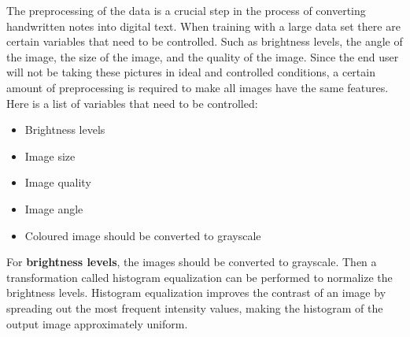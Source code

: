 \documentclass[twoside,a4paper]{article}
\begin{document}
The preprocessing of the data is a crucial step in the process of converting handwritten notes into digital text. When training with a large data set there are certain variables that need to be controlled.
Such as brightness levels, the angle of the image, the size of the image, and the quality of the image. Since the end user will not be taking these pictures in ideal and controlled conditions,
a certain amount of preprocessing is required to make all images have the same features. 
Here is a list of variables that need to be controlled:
\begin{itemize}
    \item Brightness levels
    \item Image size
    \item Image quality
    \item Image angle 
    \item Coloured image should be converted to grayscale
\end{itemize}
For \textbf{brightness levels}, the images should be converted to grayscale. Then a transformation called histogram equalization can be performed to normalize the brightness levels. 
Histogram equalization improves the contrast of an image by spreading out the most frequent intensity values, making the histogram of the output image approximately uniform.~\cite{OpenCV_Histogram_Equalization}




\printbibliography
\end{document}
